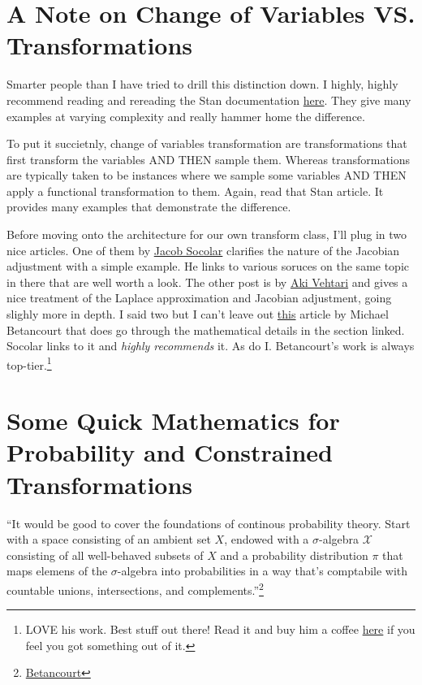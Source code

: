 \documentclass[
  letterpaper,
  DIV=11,
  numbers=noendperiod]{scrartcl}
\begin{document}
\section{A Note on Change of Variables VS.
Transformations}\label{a-note-on-change-of-variables-vs.-transformations}

Smarter people than I have tried to drill this distinction down. I
highly, highly recommend reading and rereading the Stan documentation
\href{https://mc-stan.org/docs/stan-users-guide/reparameterization.html\#change-of-variables.chapter}{here}.
They give many examples at varying complexity and really hammer home the
difference.

To put it succietnly, change of variables transformation are
transformations that first transform the variables AND THEN sample them.
Whereas transformations are typically taken to be instances where we
sample some variables AND THEN apply a functional transformation to
them. Again, read that Stan article. It provides many examples that
demonstrate the difference.

Before moving onto the architecture for our own transform class, I'll
plug in two nice articles. One of them by
\href{https://jsocolar.github.io/jacobians/\#fn9}{Jacob Socolar}
clarifies the nature of the Jacobian adjustment with a simple example.
He links to various soruces on the same topic in there that are well
worth a look. The other post is by
\href{https://users.aalto.fi/~ave/casestudies/Jacobian/jacobian.html}{Aki
Vehtari} and gives a nice treatment of the Laplace approximation and
Jacobian adjustment, going slighly more in depth. I said two but I can't
leave out
\href{https://betanalpha.github.io/assets/case_studies/probability_theory.html\#4_representing_probability_distributions_with_densities}{this}
article by Michael Betancourt that does go through the mathematical
details in the section linked. Socolar links to it and \emph{highly
recommends} it. As do I. Betancourt's work is always
top-tier.\footnote{LOVE his work. Best stuff out there! Read it and buy
  him a coffee \href{https://www.patreon.com/betanalpha}{here} if you
  feel you got something out of it.}

\section{Some Quick Mathematics for Probability and Constrained
Transformations}\label{some-quick-mathematics-for-probability-and-constrained-transformations}

``It would be good to cover the foundations of continous probability
theory. Start with a space consisting of an ambient set \(X\), endowed
with a \(\sigma\)-algebra \(\mathcal{X}\) consisting of all well-behaved
subsets of \(X\) and a probability distribution \(\pi\) that maps
elemens of the \(\sigma\)-algebra into probabilities in a way that's
comptabile with countable unions, intersections, and
complements.''\footnote{\href{https://discourse.mc-stan.org/t/why-transformations-need-to-be-invertible-in-change-of-variable-in-probability-theory/22317/11?u=mike1}{Betancourt}}
\end{document}
